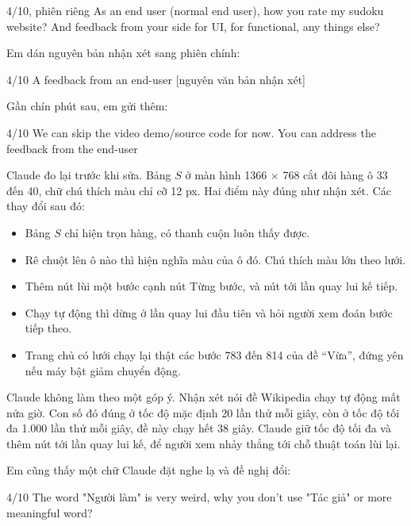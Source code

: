 \begin{promptbox}{4/10, phiên riêng}
As an end user (normal end user), how you rate my sudoku website? And feedback from your side for UI, for functional, any things else?
\end{promptbox}

Em dán nguyên bản nhận xét sang phiên chính:

\begin{promptbox}{4/10}
A feedback from an end-user [nguyên văn bản nhận xét]
\end{promptbox}

Gần chín phút sau, em gửi thêm:

\begin{promptbox}{4/10}
We can skip the video demo/source code for now. You can address the feedback from the end-user
\end{promptbox}

Claude đo lại trước khi sửa. Bảng $S$ ở màn hình 1366 × 768 cắt đôi hàng ô 33 đến 40, chữ chú thích màu chỉ cỡ 12 px. Hai điểm này đúng như nhận xét. Các thay đổi sau đó:

\begin{itemize}
  \item Bảng $S$ chỉ hiện trọn hàng, có thanh cuộn luôn thấy được.
  \item Rê chuột lên ô nào thì hiện nghĩa màu của ô đó. Chú thích màu lớn theo lưới.
  \item Thêm nút lùi một bước cạnh nút Từng bước, và nút tới lần quay lui kế tiếp.
  \item Chạy tự động thì dừng ở lần quay lui đầu tiên và hỏi người xem đoán bước tiếp theo.
  \item Trang chủ có lưới chạy lại thật các bước 783 đến 814 của đề ``Vừa'', đứng yên nếu máy bật giảm chuyển động.
\end{itemize}

Claude không làm theo một góp ý. Nhận xét nói đề Wikipedia chạy tự động mất nửa giờ. Con số đó đúng ở tốc độ mặc định 20 lần thử mỗi giây, còn ở tốc độ tối đa 1.000 lần thử mỗi giây, đề này chạy hết 38 giây. Claude giữ tốc độ tối đa và thêm nút tới lần quay lui kế, để người xem nhảy thẳng tới chỗ thuật toán lùi lại.

Em cũng thấy một chữ Claude đặt nghe lạ và đề nghị đổi:

\begin{promptbox}{4/10}
The word "Người làm" is very weird, why you don't use "Tác giả" or more meaningful word?
\end{promptbox}

